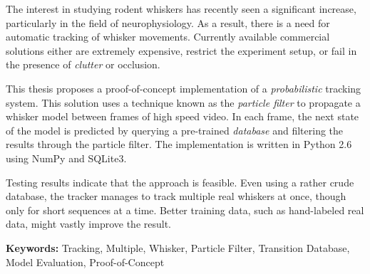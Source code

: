 The interest in studying rodent whiskers has recently seen a
significant increase, particularly in the field of neurophysiology. As
a result, there is a need for automatic tracking of whisker
movements. Currently available commercial solutions either are
extremely expensive, restrict the experiment setup, or fail in the
presence of \emph{clutter} or occlusion.

This thesis proposes a proof-of-concept implementation of a
\emph{probabilistic} tracking system.  This solution uses a technique
known as the \emph{particle filter} to propagate a whisker model
between frames of high speed video.  In each frame, the next state of
the model is predicted by querying a pre-trained \emph{database} and
filtering the results through the particle filter. The implementation
is written in Python 2.6 using NumPy and SQLite3.

Testing results indicate that the approach is feasible. Even using a
rather crude database, the tracker manages to track multiple real
whiskers at once, though only for short sequences at a time. Better
training data, such as hand-labeled real data, might vastly improve
the result.

\textbf{Keywords:} Tracking, Multiple, Whisker, Particle Filter,
Transition Database, Model Evaluation, Proof-of-Concept
